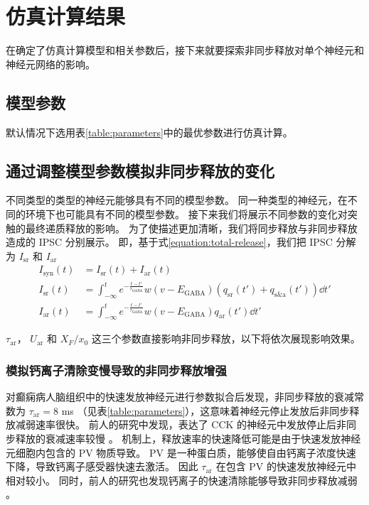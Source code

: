 \chapter{仿真计算结果}
\label{chapter:results}
在确定了仿真计算模型和相关参数后，接下来就要探索非同步释放对单个神经元和神经元网络的影响。

\section{模型参数}
\label{section:results:parameters}
默认情况下选用表\ref{table:parameters}中的最优参数进行仿真计算。

\section{通过调整模型参数模拟非同步释放的变化}
\label{section:result:modulate-asynchronous-release}
不同类型的类型的神经元能够具有不同的模型参数。
同一种类型的神经元，在不同的环境下也可能具有不同的模型参数。
接下来我们将展示不同参数的变化对突触的最终递质释放的影响。
为了使描述更加清晰，我们将同步释放与非同步释放造成的 IPSC 分别展示。
即，基于式\ref{equation:total-release}，我们把 IPSC 分解为 $I_\text{sr}$ 和 $I_\text{ar}$
\begin{align}
I_\text{syn}(t) &= I_\text{sr}(t) + I_\text{ar}(t) \\
I_\text{sr}(t) &= \int_{-\infty}^t e^{-\frac{t - t'}{\tau_\text{GABA}}} w(v - E_\text{GABA})\left( q_\text{sr}(t') + q_\text{s\&a}(t') \right) \dd{t'} \\
I_\text{ar}(t) &= \int_{-\infty}^t e^{-\frac{t - t'}{\tau_\text{GABA}}} w(v - E_\text{GABA})q_\text{ar}(t') \dd{t'}
\end{align}

$\tau_\text{ar}$， $U_\text{ar}$ 和 $X_F / x_0$ 这三个参数直接影响非同步释放，以下将依次展现影响效果。

\subsection{模拟钙离子清除变慢导致的非同步释放增强}
\label{section:result:modulate-with-tau-ar}
对癫痫病人脑组织中的快速发放神经元进行参数拟合后发现，非同步释放的衰减常数为 $\tau_\text{ar} = 8$ ms （见表\ref{table:parameters}），这意味着神经元停止发放后非同步释放减弱速率很快。
前人的研究中发现，表达了 CCK 的神经元中发放停止后非同步释放的衰减速率较慢 \cite{Hefft2005}。
机制上，释放速率的快速降低可能是由于快速发放神经元细胞内包含的 PV 物质导致。
PV 是一种蛋白质，能够使自由钙离子浓度快速下降，导致钙离子感受器快速去激活。
因此 $\tau_\text{ar}$ 在包含 PV 的快速发放神经元中相对较小。
同时，前人的研究也发现钙离子的快速清除能够导致非同步释放减弱 \cite{Jiang2015}。

